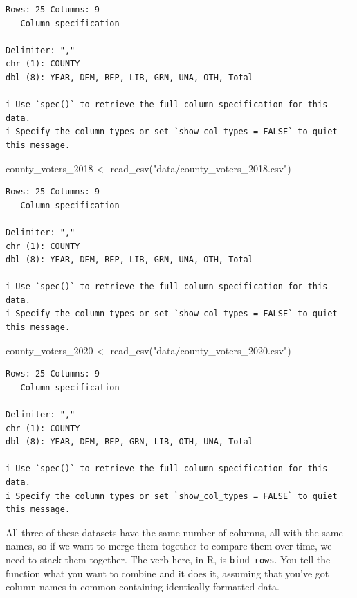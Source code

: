 \documentclass[
  letterpaper,
  DIV=11,
  numbers=noendperiod]{scrreprt}
\newenvironment{Shaded}{\begin{snugshade}}{\end{snugshade}}
\newcommand{\FunctionTok}[1]{\textcolor[rgb]{0.28,0.35,0.67}{#1}}
\newcommand{\NormalTok}[1]{\textcolor[rgb]{0.00,0.23,0.31}{#1}}
\newcommand{\OtherTok}[1]{\textcolor[rgb]{0.00,0.23,0.31}{#1}}
\newcommand{\StringTok}[1]{\textcolor[rgb]{0.13,0.47,0.30}{#1}}
\begin{document}
\begin{verbatim}
Rows: 25 Columns: 9
-- Column specification --------------------------------------------------------
Delimiter: ","
chr (1): COUNTY
dbl (8): YEAR, DEM, REP, LIB, GRN, UNA, OTH, Total

i Use `spec()` to retrieve the full column specification for this data.
i Specify the column types or set `show_col_types = FALSE` to quiet this message.
\end{verbatim}

\begin{Shaded}
\begin{Highlighting}[]
\NormalTok{county\_voters\_2018 }\OtherTok{\textless{}{-}} \FunctionTok{read\_csv}\NormalTok{(}\StringTok{"data/county\_voters\_2018.csv"}\NormalTok{)}
\end{Highlighting}
\end{Shaded}

\begin{verbatim}
Rows: 25 Columns: 9
-- Column specification --------------------------------------------------------
Delimiter: ","
chr (1): COUNTY
dbl (8): YEAR, DEM, REP, LIB, GRN, UNA, OTH, Total

i Use `spec()` to retrieve the full column specification for this data.
i Specify the column types or set `show_col_types = FALSE` to quiet this message.
\end{verbatim}

\begin{Shaded}
\begin{Highlighting}[]
\NormalTok{county\_voters\_2020 }\OtherTok{\textless{}{-}} \FunctionTok{read\_csv}\NormalTok{(}\StringTok{"data/county\_voters\_2020.csv"}\NormalTok{)}
\end{Highlighting}
\end{Shaded}

\begin{verbatim}
Rows: 25 Columns: 9
-- Column specification --------------------------------------------------------
Delimiter: ","
chr (1): COUNTY
dbl (8): YEAR, DEM, REP, GRN, LIB, OTH, UNA, Total

i Use `spec()` to retrieve the full column specification for this data.
i Specify the column types or set `show_col_types = FALSE` to quiet this message.
\end{verbatim}

All three of these datasets have the same number of columns, all with
the same names, so if we want to merge them together to compare them
over time, we need to stack them together. The verb here, in R, is
\texttt{bind\_rows}. You tell the function what you want to combine and
it does it, assuming that you've got column names in common containing
identically formatted data.
\end{document}

